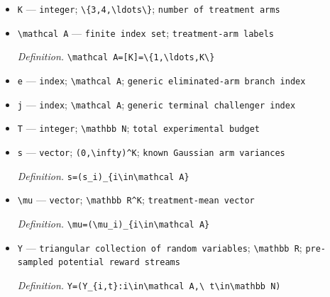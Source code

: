 \documentclass{article}
\begin{document}
\begin{itemize}
  \item \texttt{K} --- \texttt{integer}; \texttt{\textbackslash{}\allowbreak{}\{3,\allowbreak{}4,\allowbreak{}\textbackslash{}\allowbreak{}ldots\textbackslash{}\allowbreak{}\}\allowbreak{}}; \texttt{number of treatment arms}
  \item \texttt{\textbackslash{}\allowbreak{}mathcal A} --- \texttt{finite index set}; \texttt{treatment-\allowbreak{}arm labels}
  \par\smallskip\noindent\emph{Definition.} \texttt{\textbackslash{}\allowbreak{}mathcal A=\allowbreak{}[K]=\allowbreak{}\textbackslash{}\allowbreak{}\{1,\allowbreak{}\textbackslash{}\allowbreak{}ldots,\allowbreak{}K\textbackslash{}\allowbreak{}\}\allowbreak{}}
  \item \texttt{e} --- \texttt{index}; \texttt{\textbackslash{}\allowbreak{}mathcal A}; \texttt{generic eliminated-\allowbreak{}arm branch index}
  \item \texttt{j} --- \texttt{index}; \texttt{\textbackslash{}\allowbreak{}mathcal A}; \texttt{generic terminal challenger index}
  \item \texttt{T} --- \texttt{integer}; \texttt{\textbackslash{}\allowbreak{}mathbb N}; \texttt{total experimental budget}
  \item \texttt{s} --- \texttt{vector}; \texttt{(0,\allowbreak{}\textbackslash{}\allowbreak{}infty)\textasciicircum{}K}; \texttt{known Gaussian arm variances}
  \par\smallskip\noindent\emph{Definition.} \texttt{s=\allowbreak{}(s\_\allowbreak{}i)\_\allowbreak{}\{i\textbackslash{}\allowbreak{}in\textbackslash{}\allowbreak{}mathcal A\}\allowbreak{}}
  \item \texttt{\textbackslash{}\allowbreak{}mu} --- \texttt{vector}; \texttt{\textbackslash{}\allowbreak{}mathbb R\textasciicircum{}K}; \texttt{treatment-\allowbreak{}mean vector}
  \par\smallskip\noindent\emph{Definition.} \texttt{\textbackslash{}\allowbreak{}mu=\allowbreak{}(\textbackslash{}\allowbreak{}mu\_\allowbreak{}i)\_\allowbreak{}\{i\textbackslash{}\allowbreak{}in\textbackslash{}\allowbreak{}mathcal A\}\allowbreak{}}
  \item \texttt{Y} --- \texttt{triangular collection of random variables}; \texttt{\textbackslash{}\allowbreak{}mathbb R}; \texttt{pre-\allowbreak{}sampled potential reward streams}
  \par\smallskip\noindent\emph{Definition.} \texttt{Y=\allowbreak{}(Y\_\allowbreak{}\{i,\allowbreak{}t\}\allowbreak{}:\allowbreak{}i\textbackslash{}\allowbreak{}in\textbackslash{}\allowbreak{}mathcal A,\allowbreak{}\textbackslash{}\allowbreak{} t\textbackslash{}\allowbreak{}in\textbackslash{}\allowbreak{}mathbb N)}

\end{itemize}
\end{document}
